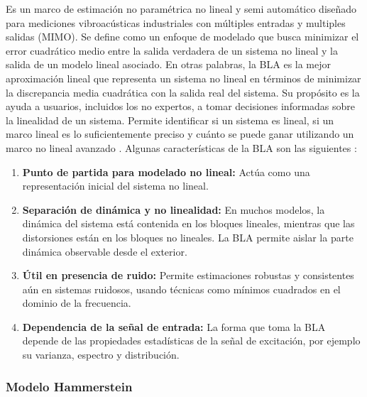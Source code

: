 \documentclass[11pt]{report}
\begin{document}
Es un marco de estimación no paramétrica no lineal y semi automático diseñado para mediciones vibroacústicas industriales con múltiples entradas y multiples salidas (MIMO). Se define como un enfoque de modelado que busca minimizar el error cuadrático medio entre la salida verdadera de un sistema no lineal y la salida de un modelo lineal asociado. En otras palabras, la BLA es la mejor aproximación lineal que representa un sistema no lineal en términos de minimizar la discrepancia media cuadrática con la salida real del sistema. Su propósito es la ayuda a usuarios, incluidos los no expertos, a tomar decisiones informadas sobre la linealidad de un sistema. Permite identificar si un sistema es lineal, si un marco lineal es lo suficientemente preciso y cuánto se puede ganar utilizando un marco no lineal avanzado \cite{csurcsia2020user} . Algunas características de la BLA son las siguientes \cite{schoukens2017identification}: 
\begin{enumerate}
    \item \textbf{Punto de partida para modelado no lineal:} Actúa como una representación inicial del sistema no lineal.
    \item \textbf{Separación de dinámica y no linealidad:} En muchos modelos, la dinámica del sistema está contenida en los bloques lineales, mientras que las distorsiones están en los bloques no lineales. La BLA permite aislar la parte dinámica observable desde el exterior.
    \item \textbf{Útil en presencia de ruido:} Permite estimaciones robustas y consistentes aún en sistemas ruidosos, usando técnicas como mínimos cuadrados en el dominio de la frecuencia.
    \item \textbf{Dependencia de la señal de entrada:} La forma que toma la BLA depende de las propiedades estadísticas de la señal de excitación, por ejemplo su varianza, espectro y distribución.
\end{enumerate}


\subsubsection{Modelo Hammerstein}
\end{document}
